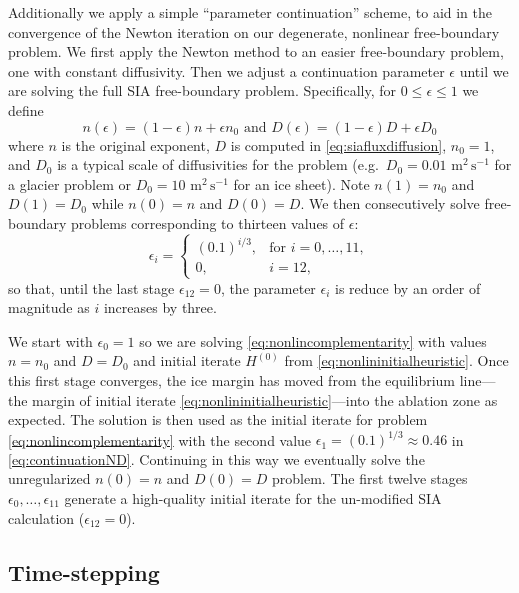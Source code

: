 \documentclass[twocolumn,a4paper]{igs}
\newcommand\eps{\epsilon}
\begin{document}
Additionally we apply a simple ``parameter continuation'' scheme, to aid in the convergence of the Newton iteration on our degenerate, nonlinear free-boundary problem.  We first apply the Newton method to an easier free-boundary problem, one with constant diffusivity.  Then we adjust a continuation parameter $\eps$ until we are solving the full SIA free-boundary problem.  Specifically, for $0 \le \eps \le 1$ we define
\begin{equation}
n(\eps) = (1\!-\eps) n + \eps n_0 \text{ and } D(\eps) = (1\!-\eps) D + \eps D_0  \label{eq:continuationND}
\end{equation}
where $n$ is the original exponent, $D$ is computed in \eqref{eq:siafluxdiffusion}, $n_0=1$, and $D_0$ is a typical scale of diffusivities for the problem (e.g.~$D_0=0.01$ $\text{m}^2\,\text{s}^{-1}$ for a glacier problem or $D_0=10$ $\text{m}^2\,\text{s}^{-1}$ for an ice sheet).  Note $n(1)=n_0$ and $D(1)=D_0$ while $n(0)=n$ and $D(0)=D$.  We then consecutively solve free-boundary problems corresponding to thirteen values of $\eps$:
\begin{equation}
\eps_i = \begin{cases}
           (0.1)^{i/3}, & \text{for } i=0,\dots,11, \\
           0, & i=12,
         \end{cases}  \label{eq:continuationseq}
\end{equation}
so that, until the last stage $\eps_{12}=0$, the parameter $\eps_i$ is reduce by an order of magnitude as $i$ increases by three.

We start with $\eps_0=1$ so we are solving \eqref{eq:nonlincomplementarity} with values $n=n_0$ and $D=D_0$ and initial iterate $H^{(0)}$ from \eqref{eq:nonlininitialheuristic}.  Once this first stage converges, the ice margin has moved from the equilibrium line---the margin of initial iterate \eqref{eq:nonlininitialheuristic}---into the ablation zone as expected.  The solution is then used as the initial iterate for problem \eqref{eq:nonlincomplementarity} with the second value $\eps_1=(0.1)^{1/3}\approx 0.46$ in \eqref{eq:continuationND}.  Continuing in this way we eventually solve the unregularized $n(0)=n$ and $D(0)=D$ problem.  The first twelve stages $\eps_0,\dots,\eps_{11}$ generate a high-quality initial iterate for the un-modified SIA calculation ($\eps_{12}=0$). 


\subsection{Time-stepping}
\end{document}
